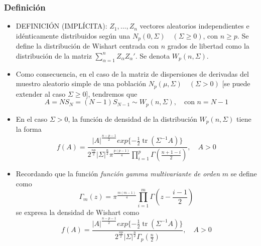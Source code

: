 \documentclass[11pt,a4paper]{article}
\begin{document}
\subsubsection{Definición}
\begin{itemize}
\item DEFINICIÓN (IMPLÍCITA): $Z_{1}, \dots, Z_{n}$ vectores aleatorios independientes e idénticamente distribuidos según una $N_{p}(0, \Sigma) \quad (\Sigma \geq 0)$, con $n \geq p$. Se define la distribución de Wishart centrada con $n$ grados de libertad como la distribución de la matriz $\sum_{\alpha=1}^{n} Z_{\alpha}Z_{\alpha}'$. Se denota $W_{p}(n, \Sigma)$.

\item Como consecuencia, en el caso de la matriz de dispersiones de derivadas del muestro aleatorio simple de una población $N_{p}(\mu, \Sigma) \quad (\Sigma > 0)$ [se puede extender al caso $\Sigma \geq 0$], tendremos que
$$A = NS_{N} = (N-1)S_{N-1} \sim W_{p}(n, \Sigma), \quad \text{con } n = N-1$$

\item En el caso $\Sigma > 0$, la función de densidad de la distribución $W_{p}(n, \Sigma)$ tiene la forma
$$f(A) = \frac{|A|^{\frac{n-p-1}{2}} exp\{-\frac{1}{2} \operatorname{tr}(\Sigma^{-1}A)\}}{2^{\frac{np}{2}}|\Sigma|^{\frac{n}{2}}\pi^{\frac{p(p-1)}{4}}\prod_{i=1}^{p}\Gamma(\frac{n+1-i}{2})}, \quad A > 0$$

\item Recordando que la función \emph{función gamma multivariante de orden} $m$ se define como
$$\Gamma_{m}(z) = \pi^{\frac{m(m-1)}{4}} \prod_{i=1}^{m} \Gamma(z - \frac{i-1}{2})$$
se expresa la densidad de Wishart como
$$f(A) = \frac{|A|^{\frac{n-p-1}{2}} exp\{-\frac{1}{2} \operatorname{tr}(\Sigma^{-1}A)\}}{2^{\frac{np}{2}}|\Sigma|^{\frac{n}{2}}\Gamma_{p}(\frac{n}{2})}, \quad A > 0$$
\end{itemize}
\end{document}
